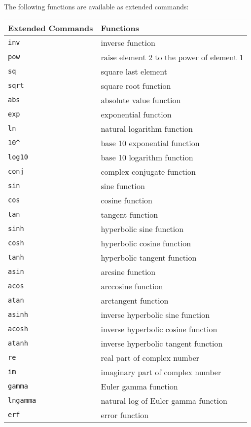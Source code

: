 \documentclass[11pt,notitlepage]{article}
\begin{document}
The following functions are available as extended commands:
\begin{center}
   \begin{tabular}[t]{|l|l|}
      \hline Extended Commands & Functions \\
      \hline
      {\tt inv} & inverse function \\
      {\tt pow} & raise element 2 to the power of element 1 \\
      {\tt sq}  & square last element \\
      {\tt sqrt} & square root function \\
      {\tt abs } & absolute value function \\
      {\tt exp } & exponential function \\
      {\tt ln } & natural logarithm function \\
      {\tt 10\^{} } & base 10 exponential function \\
      {\tt log10 } & base 10 logarithm function \\
      {\tt conj } & complex conjugate function \\
      {\tt sin} & sine function \\
      {\tt cos} & cosine function \\
      {\tt tan} & tangent function \\
      {\tt sinh} & hyperbolic sine function \\
      {\tt cosh} & hyperbolic cosine function \\
      {\tt tanh} & hyperbolic tangent function \\
      {\tt asin} & arcsine function \\
      {\tt acos} & arccosine function \\
      {\tt atan} & arctangent function \\
      {\tt asinh} & inverse hyperbolic sine function \\
      {\tt acosh} & inverse hyperbolic cosine function \\
      {\tt atanh} & inverse hyperbolic tangent function \\
      {\tt re} & real part of complex number \\
      {\tt im} & imaginary part of complex number \\
      {\tt gamma} & Euler gamma function \\
      {\tt lngamma} & natural log of Euler gamma function \\
      {\tt erf} & error function \\

\end{tabular}
\end{center}
\end{document}
